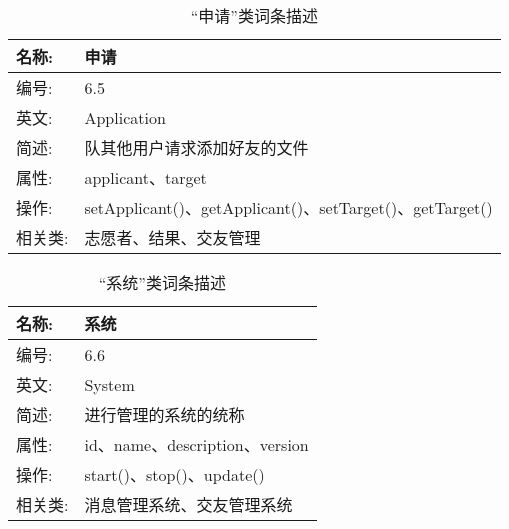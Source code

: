 \begin{table}[H]  
\caption{“申请”类词条描述}  
\begin{center}  
    \begin{tabular}{l p{11cm}} 
        \hline
        \quad 名称:  &  申请 \\
        \hline
        \quad 编号:  & 6.5 \\
        \hline
        \quad 英文:  &  Application \\
        \hline
        \quad 简述:  & 队其他用户请求添加好友的文件 \\
        \hline
        \quad 属性:  & applicant、target\\
        \hline
        \quad 操作:  & setApplicant()、getApplicant()、setTarget()、getTarget()\\
        \hline
        \quad 相关类:  & 志愿者、结果、交友管理 \\
        \hline
    \end{tabular}
\end{center}
\end{table}

\begin{table}[H]  
\caption{“系统”类词条描述}  
\begin{center}  
    \begin{tabular}{l p{11cm}} 
        \hline
        \quad 名称:  &  系统 \\
        \hline
        \quad 编号:  & 6.6 \\
        \hline
        \quad 英文:  &  System \\
        \hline
        \quad 简述:  & 进行管理的系统的统称 \\
        \hline
        \quad 属性:  & id、name、description、version\\
        \hline
        \quad 操作:  & start()、stop()、update()\\
        \hline
        \quad 相关类:  & 消息管理系统、交友管理系统 \\
        \hline
    \end{tabular}
\end{center}
\end{table}

